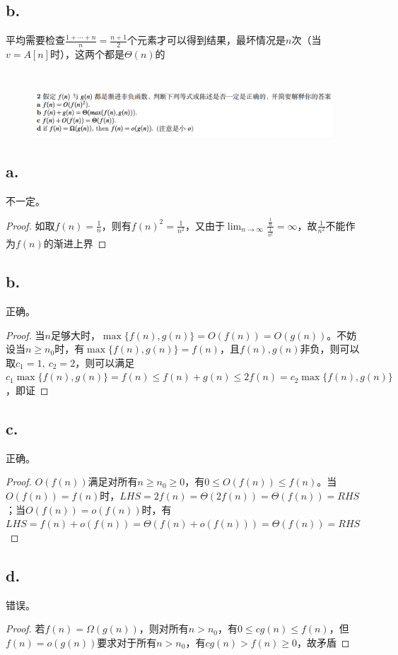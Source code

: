 \documentclass[]{report}
\begin{document}
    \subsection{b.}
      平均需要检查$\frac{1+\cdots+n}{n}=\frac{n+1}{2}$个元素才可以得到结果，最坏情况是$n$次（当$v=A[n]$时），这两个都是$\Theta(n)$的

    \section{}%
    \begin{figure}[h!]
      \centering
      \includegraphics[scale=0.3]{images/Pro_2.png}
    \end{figure}
    \subsection{a.}
      不一定。
      \begin{proof}
        如取$f(n)=\frac{1}{n}$，则有$f(n)^2=\frac{1}{n^2}$，又由于$\displaystyle\lim_{n\to\infty}\frac{\frac{1}{n}}{\frac{1}{n^2}}=\infty$，故$\frac{1}{n^2}$不能作为$f(n)$的渐进上界
      \end{proof}
    \subsection{b.}
      正确。
      \begin{proof}
        当$n$足够大时，$\max\{f(n),g(n)\}=O(f(n))=O(g(n))$。不妨设当$n\ge n_0$时，有$\max\{f(n),g(n)\}=f(n)$，且$f(n),g(n)$非负，则可以取$c_1=1,\ c_2=2$，则可以满足$c_1\max\{f(n),g(n)\}=f(n)\le f(n)+g(n)\le 2f(n)=c_2\max\{f(n),g(n)\}$，即证
      \end{proof}
    \subsection{c.}
      正确。
      \begin{proof}
        $O(f(n))$满足对所有$n\ge n_0\ge0$，有$0\le O(f(n))\le f(n)$。当$O(f(n))=f(n)$时，$LHS=2f(n)=\Theta(2f(n))=\Theta(f(n))=RHS$；当$O(f(n))=o(f(n))$时，有$LHS=f(n)+o(f(n))=\Theta(f(n)+o(f(n)))=\Theta(f(n))=RHS$
      \end{proof}
    \subsection{d.}
      错误。
      \begin{proof}
        若$f(n)=\Omega(g(n))$，则对所有$n>n_0$，有$0\le cg(n)\le f(n)$，但$f(n)=o(g(n))$要求对于所有$n>n_0$，有$cg(n)>f(n)\ge0$，故矛盾
      \end{proof}
\end{document}
